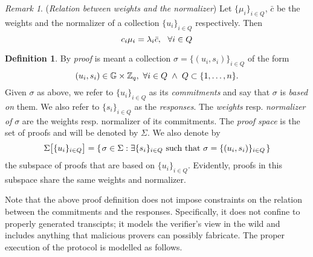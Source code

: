 \documentclass[psamsfonts, reqno]{amsart}
\theoremstyle{definition}
\newtheorem{defn}[thm]{Definition}
\theoremstyle{remark}
\newtheorem{rem}[thm]{Remark}
\numberwithin{equation}{section}
\begin{document}
\begin{rem}\label{orst_core_remark}
(\textit{Relation between weights and the normalizer})
Let $\{\mu_i\}_{i \in Q}$, $\bar{c}$ be the weights
and the normalizer of a collection $\{u_i\}_{i \in Q}$
respectively. Then
\vspace{5pt}
\begin{equation}\label{orst_core}
c_i \mu_i = \lambda_i \bar{c},\ \ \forall i \in Q
\vspace{5pt}
\end{equation}
\end{rem}

\begin{defn}\label{orst_proof_def}
By \textit{proof} is meant a collection
$\sigma = \{(u_i, s_i)\}_{i \in Q}$ of the form
\vspace{5pt}
\begin{equation*}\label{orst_proof_form}
(u_i, s_i) \in \mathbb{G} \times \mathbb{Z}_q,
\ \forall i \in Q
\hspace{3pt}
\land
\hspace{3pt}
Q \subset \{1, \dots, n\}.
\vspace{5pt}
\end{equation*}
Given $\sigma$ as above, we refer to
$\{u_i\}_{i \in Q}$ as its \textit{commitments} and
say that $\sigma$ is \textit{based on} them.
We also refer to $\{s_i\}_{i \in Q}$ as the
\textit{responses}.
The \textit{weights} resp. \textit{normalizer of} $\sigma$
are the weights resp. normalizer of its commitments.
The \textit{proof space}
is the set of proofs and will be denoted by $\Sigma$.
We also denote by
\vspace{5pt}
\begin{equation}\label{orst_proofs_on_commitments}
\Sigma\big[\{u_i\}_{i \in Q}\big] =
\{
	\hspace{1pt}
	\sigma \in \Sigma:
	\exists \{s_i\}_{i \in Q} \textup{ such that }
	\sigma = \{(u_i, s_i)\}_{i \in Q}
	\hspace{1pt}
\}
\vspace{5pt}
\end{equation}
the subspace of proofs that are based on $\{u_i\}_{i \in Q}$.
Evidently, proofs in this subspace
share the same weights and normalizer.
\end{defn}

\noindent
Note that the above proof definition does not impose
constraints on the relation between
the commitments and the responses.
Specifically, it does not confine
to properly generated transcipts;
it models the verifier's view in the wild
and includes anything that malicious provers can possibly fabricate.
The proper execution of the protocol
is modelled as follows.
\end{document}
